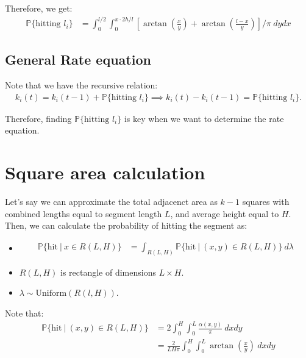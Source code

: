 \documentclass{article}
\theoremstyle{definition}
\theoremstyle{remark}
\begin{document}
Therefore, we get:
\begin{align}
    \mathbb{P}\{ \text{hitting } l_i \} &= \int_{0}^{l/2} \int_{0}^{x\cdot 2h/l} \left[ \arctan\left( \frac{x}{y} \right) + \arctan\left( \frac{l-x}{y}  \right) \right] / \pi \ dy dx
\end{align}


\subsection{General Rate equation}
Note that we have the recursive relation:
\begin{align}
    k_{i}(t) = k_{i}(t-1) + \mathbb{P}\{ \text{hitting } l_i \} \implies k_{i}(t) - k_{i}(t-1) = \mathbb{P}\{ \text{hitting } l_i \}.
\end{align}

Therefore, finding $\mathbb{P}\{ \text{hitting } l_i \}$ is key when we want to determine the rate equation.

\newpage
\newpage
\section{Square area calculation}
Let's say we can approximate the total adjacenct area as $k-1$ squares with combined lengths equal to segment length $L$, and average height equal to $H$. Then, we can calculate the probability of hitting the segment as:
\begin{itemize}

    \item \begin{align}
        \mathbb{P}\{ \text{hit} \ | \ x \in R(L,H) \} &= \int_{R(L,H)} \mathbb{P}\{ \text{hit} \ | \ (x,y) \in R(L,H) \} \ d\lambda
    \end{align}

    \item $R(L,H)$ is rectangle of dimensions $L \times H$.
    
    \item $\lambda \sim \text{Uniform}(R(l,H))$.
    
\end{itemize}

Note that:
\begin{align}
    \mathbb{P}\{ \text{hit} \ | \ (x,y) \in R(L,H) \} &= 2 \int_{0}^{H} \int_{0}^{L} \frac{ \alpha(x,y) }{ \pi }  \ dx dy \\
    &= \frac{2}{L H \pi} \int_{0}^{H} \int_{0}^{L} \arctan\left( \frac{x}{y} \right) \ dx dy 
\end{align}
\end{document}
